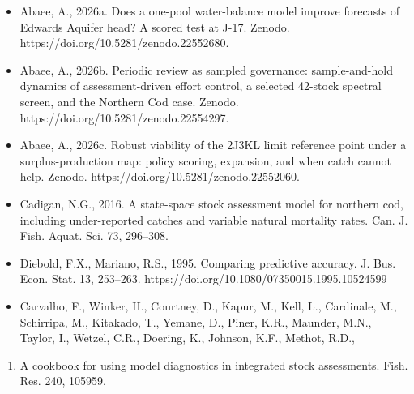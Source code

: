 \documentclass[11pt]{article}
\providecommand{\tightlist}{\setlength{\itemsep}{0.2em}\setlength{\parskip}{0pt}}
\begin{document}
\begin{itemize}
\item
  Abaee, A., 2026a. Does a one-pool water-balance model improve
  forecasts of Edwards Aquifer head? A scored test at J-17. Zenodo.
  https://doi.org/10.5281/zenodo.22552680.
\item
  Abaee, A., 2026b. Periodic review as sampled governance:
  sample-and-hold dynamics of assessment-driven effort control, a
  selected 42-stock spectral screen, and the Northern Cod case. Zenodo.
  https://doi.org/10.5281/zenodo.22554297.
\item
  Abaee, A., 2026c. Robust viability of the 2J3KL limit reference point
  under a surplus-production map: policy scoring, expansion, and when
  catch cannot help. Zenodo. https://doi.org/10.5281/zenodo.22552060.
\item
  Cadigan, N.G., 2016. A state-space stock assessment model for northern
  cod, including under-reported catches and variable natural mortality
  rates. Can. J. Fish. Aquat. Sci. 73, 296--308.
\item
  Diebold, F.X., Mariano, R.S., 1995. Comparing predictive accuracy. J.
  Bus. Econ. Stat. 13, 253--263.
  https://doi.org/10.1080/07350015.1995.10524599
\item
  Carvalho, F., Winker, H., Courtney, D., Kapur, M., Kell, L.,
  Cardinale, M., Schirripa, M., Kitakado, T., Yemane, D., Piner, K.R.,
  Maunder, M.N., Taylor, I., Wetzel, C.R., Doering, K., Johnson, K.F.,
  Methot, R.D.,
\end{itemize}

\begin{enumerate}
\def\labelenumi{\arabic{enumi}.}
\setcounter{enumi}{2020}
\tightlist
\item
  A cookbook for using model diagnostics in integrated stock
  assessments. Fish. Res. 240, 105959.
\end{enumerate}
\end{document}
